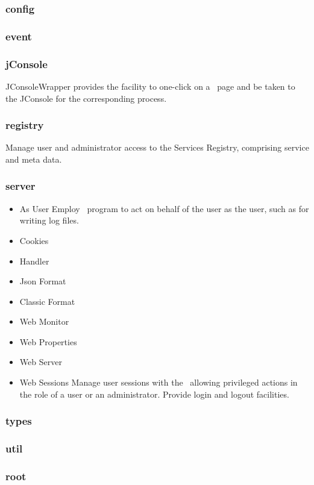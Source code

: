     \subsubsection{config}
         
    \subsubsection{event}
         
    \subsubsection{jConsole}
    
    JConsoleWrapper provides the facility to one-click on a \varDUCC~\varWebServer page
    and be taken to the JConsole for the corresponding process.
    
    \subsubsection{registry}
    
    Manage user and administrator access to the Services Registry, comprising service and meta data.    
    \subsubsection{server}
    
    \begin{itemize}
      \item As User
      Employ \varSetUid~program to act on behalf of the user as the user, such as for writing
      log files.
      \item Cookies
      \item Handler
      \item Json Format
      \item Classic Format
      \item Web Monitor
      \item Web Properties
      \item Web Server
      \item Web Sessions
      Manage user sessions with the \varWebServer~allowing privileged actions in the
      role of a user or an administrator.
      Provide login and logout facilities.
    \end{itemize} 
         
    \subsubsection{types}
    
    \subsubsection{util}
    
    \subsubsection{root}
